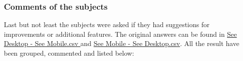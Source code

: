 \begin{table}[htb]
  \caption{Correlation between the Android version or device and the dependent variables calculated with the \gls{tau}}
  \label{table:android-tau}
  \end{table}

\subsubsection{Comments of the subjects}
Last but not least the subjects were asked if they had suggestions for improvements or additional features.
The original answers can be found in \hyperref[group1]{See Desktop - See Mobile.csv } and \hyperref[group2]{See Mobile - See Desktop.csv}.
All the result have been grouped, commented and listed below: 

